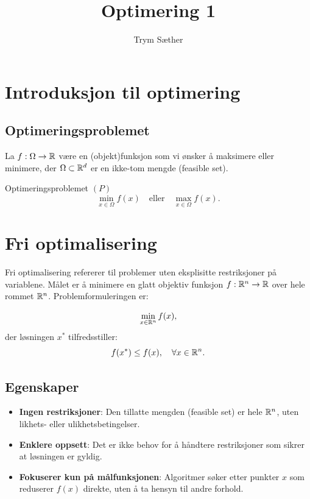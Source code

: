 \documentclass[10pt, a4paper]{article}
\begin{document}
\sloppy

\title{Optimering 1}

\author{Trym Sæther}

\maketitle

\tableofcontents

\newpage

\section{Introduksjon til optimering}

\subsection{Optimeringsproblemet}
La \(f: \Omega \to \mathbb{R}\) være en (objekt)funksjon som vi ønsker å maksimere eller minimere, der \(\Omega \subset \mathbb{R}^d\) er en ikke-tom mengde (feasible set).

\begin{definition}{Optimeringsproblemet \((P)\)}{}
  \[
    \min_{x \in \Omega} f(x) \quad \text{eller} \quad \max_{x \in \Omega} f(x).
  \]\label{def:optimization_problem}

\end{definition}

\section{Fri optimalisering}

Fri optimalisering refererer til problemer uten eksplisitte restriksjoner på variablene. Målet er å minimere en glatt objektiv funksjon \( f : \mathbb{R}^n \to \mathbb{R} \) over hele rommet \( \mathbb{R}^n \). Problemformuleringen er:

\[
  \min_{x \in \mathbb{R}^n} f(x),
\]
der løsningen \( x^* \) tilfredsstiller:
\[
  f(x^*) \leq f(x), \quad \forall x \in \mathbb{R}^n.
\]

\subsection*{Egenskaper}

\begin{itemize}
  \item \textbf{Ingen restriksjoner}: Den tillatte mengden (feasible set) er hele \( \mathbb{R}^n \), uten likhets- eller ulikhetsbetingelser.
  \item \textbf{Enklere oppsett}: Det er ikke behov for å håndtere restriksjoner som sikrer at løsningen er gyldig.
  \item \textbf{Fokuserer kun på målfunksjonen}: Algoritmer søker etter punkter \( x \) som reduserer \( f(x) \) direkte, uten å ta hensyn til andre forhold.
\end{itemize}
\end{document}
